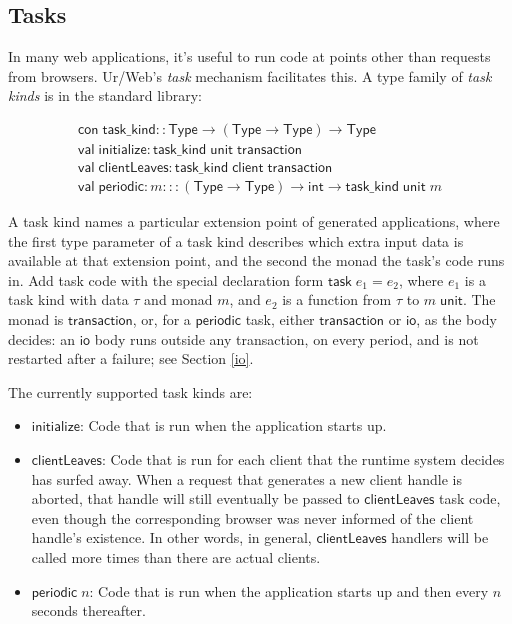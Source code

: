 \documentclass{article}
\newcommand{\mt}[1]{\mathsf{#1}}
\begin{document}
\subsection{\label{tasks}Tasks}

In many web applications, it's useful to run code at points other than requests from browsers.  Ur/Web's \emph{task} mechanism facilitates this.  A type family of \emph{task kinds} is in the standard library:

$$\begin{array}{l}
\mt{con} \; \mt{task\_kind} :: \mt{Type} \to (\mt{Type} \to \mt{Type}) \to \mt{Type} \\
\mt{val} \; \mt{initialize} : \mt{task\_kind} \; \mt{unit} \; \mt{transaction} \\
\mt{val} \; \mt{clientLeaves} : \mt{task\_kind} \; \mt{client} \; \mt{transaction} \\
\mt{val} \; \mt{periodic} : m ::: (\mt{Type} \to \mt{Type}) \to \mt{int} \to \mt{task\_kind} \; \mt{unit} \; m
\end{array}$$

A task kind names a particular extension point of generated applications, where the first type parameter of a task kind describes which extra input data is available at that extension point, and the second the monad the task's code runs in.  Add task code with the special declaration form $\mt{task} \; e_1 = e_2$, where $e_1$ is a task kind with data $\tau$ and monad $m$, and $e_2$ is a function from $\tau$ to $m \; \mt{unit}$.  The monad is $\mt{transaction}$, or, for a $\mt{periodic}$ task, either $\mt{transaction}$ or $\mt{io}$, as the body decides: an $\mt{io}$ body runs outside any transaction, on every period, and is not restarted after a failure; see Section \ref{io}.

The currently supported task kinds are:
\begin{itemize}
\item $\mt{initialize}$: Code that is run when the application starts up.
\item $\mt{clientLeaves}$: Code that is run for each client that the runtime system decides has surfed away.  When a request that generates a new client handle is aborted, that handle will still eventually be passed to $\mt{clientLeaves}$ task code, even though the corresponding browser was never informed of the client handle's existence.  In other words, in general, $\mt{clientLeaves}$ handlers will be called more times than there are actual clients.
\item $\mt{periodic} \; n$: Code that is run when the application starts up and then every $n$ seconds thereafter.
\end{itemize}
\end{document}
